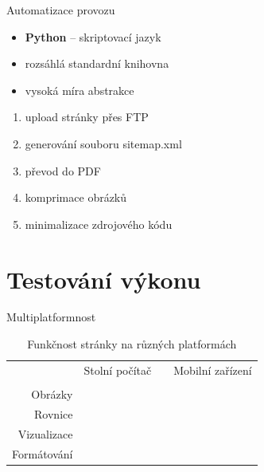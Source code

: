 \documentclass[14pt, hyperref={unicode}]{beamer}
\newlength{\originalmarginlength}
\newcommand{\Firefox}{\faIcon{firefox}}
\newcommand{\Chrome}{\faIcon{chrome}}
\newcommand{\IE}{\faIcon{internet-explorer}}
\newcommand{\Edge}{\faIcon{edge}}
\newcommand{\Safari}{\faIcon{safari}}
\newcommand{\Opera}{\faIcon{opera}}
\newcommand{\Yes}{\faIcon{check}}
\newcommand{\No}{\faIcon{times}}
\newcommand{\NA}{\faIcon{minus}}
\begin{document}
  \begin{frame}{Automatizace provozu}
    \begin{itemize}
      \item<+-> \textbf{Python} -- skriptovací jazyk
      \item<+-> rozsáhlá standardní knihovna
      \item<+-> vysoká míra abstrakce
    \end{itemize}

    \setlength\leftmargini{\originalmarginlength}

    \begin{enumerate}[<+- | alert@+>]
      \item upload stránky přes FTP
      \item generování souboru sitemap.xml
      \item převod do PDF
      \item komprimace obrázků
      \item minimalizace zdrojového kódu
    \end{enumerate}

    \setlength\leftmargini{0em}
  \end{frame}

  \section{Testování výkonu}

  \begin{frame}{Multiplatformnost}
    \begin{minipage}[b]{\textwidth}
      \begin{table}[H]
        \caption{Funkčnost stránky na různých platformách}
        \scriptsize
        \centering
        \begin{tabular}{@{}rccccccccccccc@{}}
          \toprule
            & \multicolumn{6}{c}{Stolní počítač} & \phantom{abc} & \multicolumn{6}{c}{Mobilní zařízení} \\
          \cmidrule{2-7} \cmidrule{9-14}
            & \Firefox & \Chrome & \IE & \Edge & \Safari & \Opera && \Firefox & \Chrome & \IE & \Edge & \Safari & \Opera \\
          \midrule
            Obrázky     & \Yes & \Yes & \Yes & \Yes & \Yes & \Yes && \Yes & \Yes & \NA & \Yes & \Yes & \Yes \\
            Rovnice     & \Yes & \Yes & \Yes & \Yes & \Yes & \Yes && \Yes & \Yes & \NA & \Yes & \Yes & \Yes \\
            Vizualizace & \Yes & \Yes & \No  & \Yes & \Yes & \Yes && \Yes & \Yes & \NA & \Yes & \Yes & \Yes \\
            Formátování & \Yes & \Yes & \Yes & \Yes & \Yes & \Yes && \Yes & \Yes & \NA & \Yes & \Yes & \Yes \\
          \bottomrule
        \end{tabular}
      \end{table}
    \end{minipage}
  \end{frame}
\end{document}
